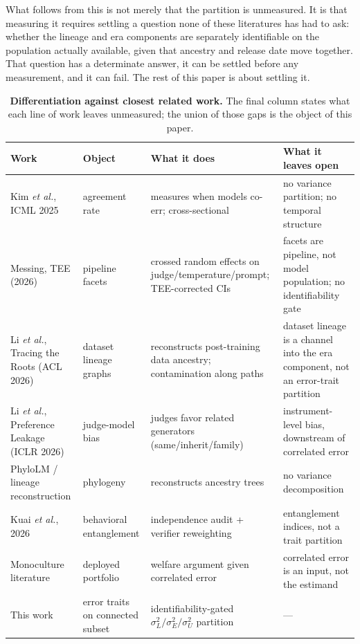 \documentclass{ieeeaccess}
\theoremstyle{definition}
\theoremstyle{plain}
\begin{document}
What follows from this is not merely that the partition is unmeasured. It is
that measuring it requires settling a question none of these literatures has
had to ask: whether the lineage and era components are separately identifiable
on the population actually available, given that ancestry and release date move
together. That question has a determinate answer, it can be settled before any
measurement, and it can fail. The rest of this paper is about settling it.

\begin{table}[!t]
\caption{\textbf{Differentiation against closest related work.} The final
column states what each line of work leaves unmeasured; the union of those
gaps is the object of this paper.}
\label{tab:diff}
\setlength{\tabcolsep}{4pt}
\begin{tabular}{|p{104pt}|p{78pt}|p{164pt}|p{118pt}|}
\hline
Work & Object & What it does & What it leaves open \\
\hline
Kim \emph{et al.}, ICML 2025 & agreement rate & measures when models co-err; cross-sectional & no variance partition; no temporal structure \\
Messing, TEE (2026) & pipeline facets & crossed random effects on judge/temperature/prompt; TEE-corrected CIs & facets are pipeline, not model population; no identifiability gate \\
Li \emph{et al.}, Tracing the Roots (ACL 2026) & dataset lineage graphs & reconstructs post-training data ancestry; contamination along paths & dataset lineage is a channel into the era component, not an error-trait partition \\
Li \emph{et al.}, Preference Leakage (ICLR 2026) & judge-model bias & judges favor related generators (same/inherit/family) & instrument-level bias, downstream of correlated error \\
PhyloLM / lineage reconstruction & phylogeny & reconstructs ancestry trees & no variance decomposition \\
Kuai \emph{et al.}, 2026 & behavioral entanglement & independence audit + verifier reweighting & entanglement indices, not a trait partition \\
Monoculture literature & deployed portfolio & welfare argument given correlated error & correlated error is an input, not the estimand \\
This work & error traits on connected subset & identifiability-gated $\sigma^{2}_{L}/\sigma^{2}_{E}/\sigma^{2}_{U}$ partition & --- \\
\hline
\end{tabular}
\end{table}
\end{document}
